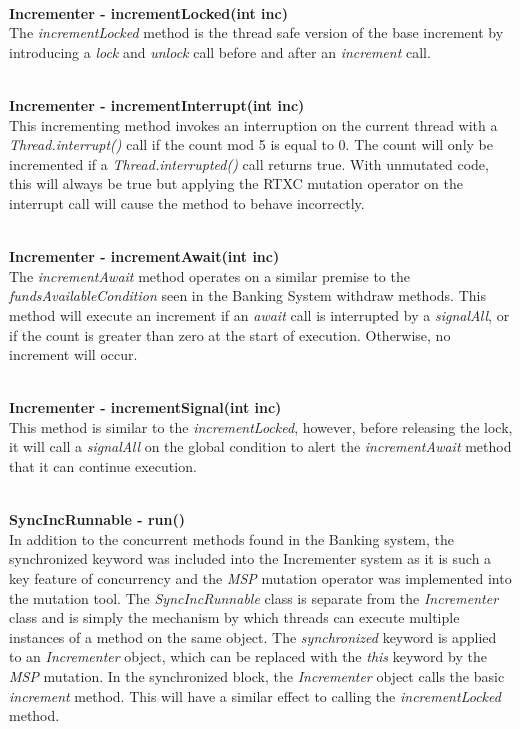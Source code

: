 \documentclass[a4paper,12pt]{article}
\begin{document}
\textbf{\\Incrementer - incrementLocked(int inc)}
\\The \textit{incrementLocked} method is the thread safe version of the base increment by introducing a \textit{lock} and \textit{unlock} call before and after an \textit{increment} call.  

\textbf{\\Incrementer - incrementInterrupt(int inc)}
\\This incrementing method invokes an interruption on the current thread with a \textit{Thread.interrupt()} call if the count mod 5 is equal to 0. The count will only be incremented if a \textit{Thread.interrupted()} call returns true. With unmutated code, this will always be true but applying the RTXC mutation operator on the interrupt call will cause the method to behave incorrectly.    

\textbf{\\Incrementer - incrementAwait(int inc)}
\\The \textit{incrementAwait} method operates on a similar premise to the \textit{fundsAvailableCondition} seen in the Banking System withdraw methods. This method will execute an increment if an \textit{await} call is interrupted by a \textit{signalAll}, or if the count is greater than zero at the start of execution. Otherwise, no increment will occur.

\textbf{\\Incrementer - incrementSignal(int inc)}
\\ This method is similar to the \textit{incrementLocked}, however, before releasing the lock, it will call a \textit{signalAll} on the global condition to alert the \textit{incrementAwait} method that it can continue execution. 

\textbf{\\SyncIncRunnable - run()}
\\In addition to the concurrent methods found in the Banking system, the synchronized keyword was included into the Incrementer system as it is such a key feature of concurrency and the \textit{MSP} mutation operator was implemented into the mutation tool. The \textit{SyncIncRunnable} class is separate from the \textit{Incrementer} class and is simply the mechanism by which threads can execute multiple instances of a method on the same object. The \textit{synchronized} keyword is applied to an \textit{Incrementer} object, which can be replaced with the \textit{this} keyword by the \textit{MSP} mutation. In the synchronized block, the \textit{Incrementer} object calls the basic \textit{increment} method. This will have a similar effect to calling the \textit{incrementLocked} method.  
\end{document}
